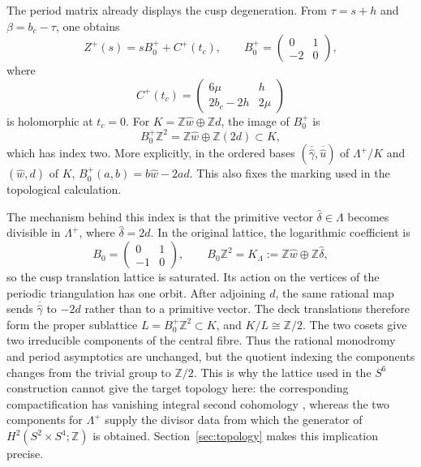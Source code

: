 \documentclass[11pt]{article}
\theoremstyle{definition}
\theoremstyle{remark}
\numberwithin{equation}{section}
\newcommand{\ZZ}{\mathbb Z}
\begin{document}
The period matrix already displays the cusp degeneration.  From
$\tau=s+h$ and $\beta=b_c-\tau$, one obtains
\begin{equation}\label{eq:an-cusp-period-splitting}
 Z^+(s)=sB_0^++C^+(t_c),
 \qquad
 B_0^+=
 \begin{pmatrix}0&1\\-2&0\end{pmatrix},
\end{equation}
where
\begin{equation}\label{eq:an-cusp-C}
 C^+(t_c)=
 \begin{pmatrix}
 6\mu&h\\2b_c-2h&2\mu
 \end{pmatrix}
\end{equation}
is holomorphic at $t_c=0$.  For
$K=\ZZ\widehat w\oplus\ZZ d$, the image of $B_0^+$ is
\begin{equation}\label{eq:an-index-two-image}
 B_0^+\ZZ^2
 =\ZZ\widehat w\oplus\ZZ(2d)\subset K,
\end{equation}
which has index two.  More explicitly, in the ordered bases
$(\overline{\widehat\gamma},\overline{\widehat u})$ of
$\Lambda^+/K$ and $(\widehat w,d)$ of $K$,
$B_0^+(a,b)=b\widehat w-2ad$.  This also fixes the marking used in the
topological calculation.

The mechanism behind this index is that the primitive vector
$\widehat\delta\in\Lambda$ becomes divisible in $\Lambda^+$, where
$\widehat\delta=2d$.  In the original lattice, the logarithmic coefficient
is
\[
 B_0=\begin{pmatrix}0&1\\-1&0\end{pmatrix},
 \qquad
 B_0\mathbb Z^2
 =K_\Lambda:=\mathbb Z\widehat w\oplus\mathbb Z\widehat\delta,
\]
so the cusp translation lattice is saturated.  Its action on the vertices
of the periodic triangulation has one orbit.  After adjoining $d$, the same
rational map sends $\overline{\widehat\gamma}$ to $-2d$ rather than to a
primitive vector.  The deck translations therefore form the proper
sublattice
$L=B_0^+\mathbb Z^2\subset K$, and
$K/L\cong\mathbb Z/2$.
The two cosets give two irreducible components of the central fibre.  Thus
the rational monodromy and period asymptotics are unchanged, but the quotient
indexing the components changes from the trivial group to $\mathbb Z/2$.
This is why the lattice used in the $S^6$ construction cannot give the
target topology here: the corresponding compactification has
vanishing integral second cohomology \citep{Alpoge2026}, whereas the two
components for $\Lambda^+$ supply the divisor data from which the generator of
$H^2(S^2\times S^4;\mathbb Z)$ is obtained.  Section~\ref{sec:topology}
makes this implication precise.
\end{document}
